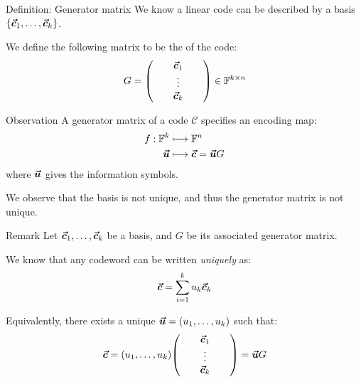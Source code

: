 \documentclass[a4paper]{article}
\begin{document}
\begin{parag}{Definition: Generator matrix}
    We know a linear code can be described by a basis $\left\{\bvec{c}_1, \ldots, \bvec{c}_k\right\}$. 

    We define the following matrix to be the  of the code:
    \[G = \begin{pmatrix} & & \bm{\protect\vec{c}}_1 & & \\ & & \vdots & & \\  & & \bm{\protect\vec{c}}_k &  & \end{pmatrix} \in \mathbb{F}^{k \times n} \]

    \begin{subparag}{Observation}
        A generator matrix of a code $\mathcal{C}$ specifies an encoding map:
        \[\begin{split}
        f: \mathbb{F}^k &\longmapsto \mathbb{F}^n \\
        \bm{\protect\vec{u}} &\longmapsto \bm{\protect\vec{c}} = \bm{\protect\vec{u}} G
        \end{split}\]
        where $\bm{\protect\vec{u}}$ gives the information symbols.

        We observe that the basis is not unique, and thus the generator matrix is not unique.
    \end{subparag}

    \begin{subparag}{Remark}
        Let $\bm{\protect\vec{c}}_1, \ldots, \bm{\protect\vec{c}}_k$ be a basis, and $G$ be its associated generator matrix.

        We know that any codeword can be written \textit{uniquely} as: 
        \[\bm{\protect\vec{c}} = \sum_{i=1}^{k} u_k \bm{\protect\vec{c}}_k\]
        
        Equivalently, there exists a unique $\bvec{u} = \left(u_1, \ldots, u_k\right)$ such that: 
        \[\bvec{c} = \left(u_1, \ldots, u_k\right) \begin{pmatrix}  &  & \bvec{c}_1 &  &  \\  &  & \vdots &  &  \\  &  & \bvec{c}_k &  &  \end{pmatrix} = \bvec{u} G\]
    \end{subparag}
\end{parag}
\end{document}

